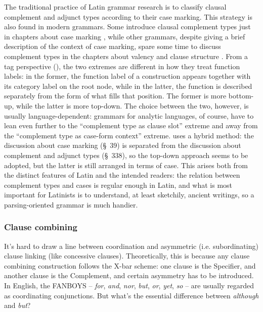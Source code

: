 \documentclass[a4paper, oneside, 12pt]{report}
\newcommand*{\citesec}[1]{\S~{#1}}
\newcommand*{\citechap}[1]{chap.~{#1}}
\newcommand{\form}[1]{\emph{#1}}
\begin{document}
{The traditional practice of Latin grammar research
is to classify clausal complement and adjunct types according to their case marking.
This strategy is also found in modern grammars.
Some introduce clausal complement types just in chapters about case marking 
\citep[\citechap{8}]{jacques2021grammar},
while other grammars, despite giving a brief description of the context of case marking,
spare some time to discuss complement types in the chapters about valency and clause structure 
\citep[\citesec{3.4}, \citechap{19}, \citechap{22}]{forker2020grammar}.
From a \ac{tag} perspective (), 
the two extremes are different in how they treat function labels:
in the former, the function label of a construction appears together with its category label on the root node,
while in the latter, the function is described separately from the form of what fills that position.
The former is more bottom-up, 
while the latter is more top-down.
The choice between the two, however, is usually language-dependent:
grammars for analytic languages, of course, have to lean even further to the 
``complement type as clause slot'' extreme 
and away from the ``complement type as case-form context'' extreme.
\citet{allen1903allen} uses a hybrid method:
the discussion about case marking (\citesec{39}) is separated from 
the discussion about complement and adjunct types (\citesec{338}),
so the top-down approach seems to be adopted,
but the latter is still arranged in terms of case.
This arises both from the distinct features of Latin and the intended readers:
the relation between complement types and cases is regular enough in Latin,
and what is most important for Latinists is to understand, at least sketchily, ancient writings, 
so a parsing-oriented grammar is much handier.

\subsubsection{Clause combining}

It's hard to draw a line between coordination and asymmetric (i.e. subordinating) clause linking 
(like concessive clauses).
Theoretically, this is because any clause combining construction follows the X-bar scheme:
one clause is the Specifier, 
and another clause is the Complement,
and certain asymmetry has to be introduced.
In English, the FANBOYS 
-- \form{for}, \form{and}, \form{nor}, \form{but}, 
\form{or}, \form{yet}, \form{so} -- are usually regarded as coordinating conjunctions.
But what's the essential difference between \form{although} and \form{but}?

}
\end{document}
